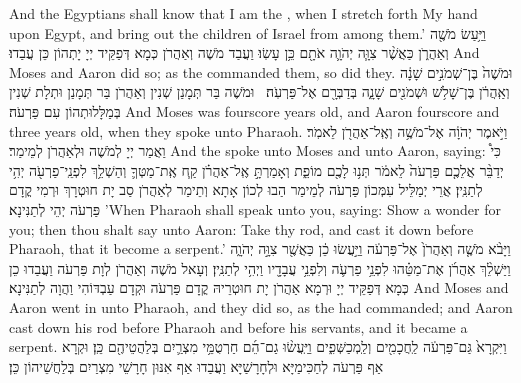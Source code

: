 {And the Egyptians shall know that I am the \lord, when I stretch forth My hand upon Egypt, and bring out the children of Israel from among them.’}{}
{וַיַּ֥עַשׂ מֹשֶׁ֖ה וְאַהֲרֹ֑ן כַּאֲשֶׁ֨ר צִוָּ֧ה יְהֹוָ֛ה אֹתָ֖ם כֵּ֥ן עָשֽׂוּ׃}
{וַעֲבַד מֹשֶׁה וְאַהֲרֹן כְּמָא דְּפַקֵּיד יְיָ יָתְהוֹן כֵּן עֲבַדוּ׃}
{And Moses and Aaron did so; as the \lord\space commanded them, so did they.}{}
{וּמֹשֶׁה֙ בֶּן־שְׁמֹנִ֣ים שָׁנָ֔ה וְאַֽהֲרֹ֔ן בֶּן־שָׁלֹ֥שׁ וּשְׁמֹנִ֖ים שָׁנָ֑ה בְּדַבְּרָ֖ם אֶל־פַּרְעֹֽה׃ \petucha }
{וּמֹשֶׁה בַּר תְּמָנַן שְׁנִין וְאַהֲרֹן בַּר תְּמָנַן וּתְלָת שְׁנִין בְּמַלָּלוּתְהוֹן עִם פַּרְעֹה׃}
{And Moses was fourscore years old, and Aaron fourscore and three years old, when they spoke unto Pharaoh.}{}
{וַיֹּ֣אמֶר יְהֹוָ֔ה אֶל־מֹשֶׁ֥ה וְאֶֽל־אַהֲרֹ֖ן לֵאמֹֽר׃}
{וַאֲמַר יְיָ לְמֹשֶׁה וּלְאַהֲרֹן לְמֵימַר׃}
{And the \lord\space spoke unto Moses and unto Aaron, saying:}{}
{כִּי֩ יְדַבֵּ֨ר אֲלֵכֶ֤ם פַּרְעֹה֙ לֵאמֹ֔ר תְּנ֥וּ לָכֶ֖ם מוֹפֵ֑ת וְאָמַרְתָּ֣ אֶֽל־אַהֲרֹ֗ן קַ֧ח אֶֽת־מַטְּךָ֛ וְהַשְׁלֵ֥ךְ לִפְנֵֽי־פַרְעֹ֖ה יְהִ֥י לְתַנִּֽין׃
}
{אֲרֵי יְמַלֵּיל עִמְּכוֹן פַּרְעֹה לְמֵימַר הַבוּ לְכוֹן אָתָא וְתֵימַר לְאַהֲרֹן סַב יָת חוּטְרָךְ וּרְמִי קֳדָם פַּרְעֹה יְהֵי לְתַנִּינָא׃}
{’When Pharaoh shall speak unto you, saying: Show a wonder for you; then thou shalt say unto Aaron: Take thy rod, and cast it down before Pharaoh, that it become a serpent.’}{}
{וַיָּבֹ֨א מֹשֶׁ֤ה וְאַהֲרֹן֙ אֶל־פַּרְעֹ֔ה וַיַּ֣עֲשׂוּ כֵ֔ן כַּאֲשֶׁ֖ר צִוָּ֣ה יְהֹוָ֑ה וַיַּשְׁלֵ֨ךְ אַהֲרֹ֜ן אֶת־מַטֵּ֗הוּ לִפְנֵ֥י פַרְעֹ֛ה וְלִפְנֵ֥י עֲבָדָ֖יו וַיְהִ֥י לְתַנִּֽין׃
}
{וְעָאל מֹשֶׁה וְאַהֲרֹן לְוָת פַּרְעֹה וַעֲבַדוּ כֵן כְּמָא דְּפַקֵּיד יְיָ וּרְמָא אַהֲרֹן יָת חוּטְרֵיהּ קֳדָם פַּרְעֹה וּקְדָם עַבְדּוֹהִי וַהֲוָה לְתַנִּינָא׃}
{And Moses and Aaron went in unto Pharaoh, and they did so, as the \lord\space had commanded; and Aaron cast down his rod before Pharaoh and before his servants, and it became a serpent.}{}
{וַיִּקְרָא֙ גַּם־פַּרְעֹ֔ה לַֽחֲכָמִ֖ים וְלַֽמְכַשְּׁפִ֑ים וַיַּֽעֲשׂ֨וּ גַם־הֵ֜ם חַרְטֻמֵּ֥י מִצְרַ֛יִם בְּלַהֲטֵיהֶ֖ם כֵּֽן׃
}
{וּקְרָא אַף פַּרְעֹה לְחַכִּימַיָּא וּלְחָרָשַׁיָּא וַעֲבַדוּ אַף אִנּוּן חָרָשֵׁי מִצְרַיִם בְּלַחֲשֵׁיהוֹן כֵּן׃}
